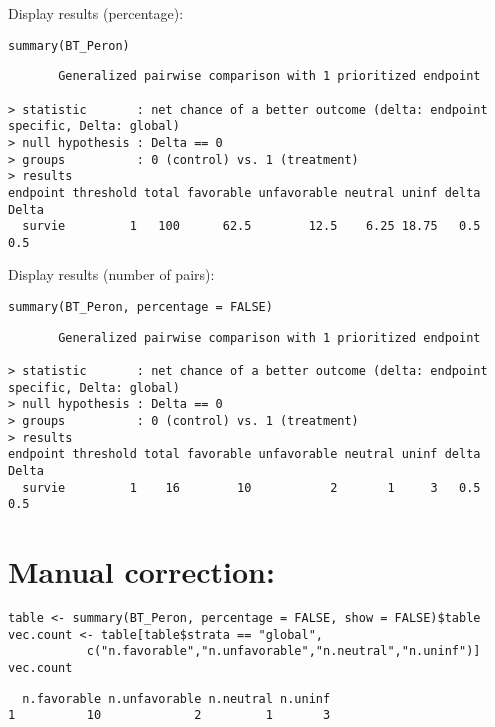 \documentclass{article}
\begin{document}
Display results (percentage):
\lstset{language=r,label= ,caption= ,captionpos=b,numbers=none}
\begin{lstlisting}
summary(BT_Peron)
\end{lstlisting}

\begin{verbatim}
       Generalized pairwise comparison with 1 prioritized endpoint

> statistic       : net chance of a better outcome (delta: endpoint specific, Delta: global) 
> null hypothesis : Delta == 0 
> groups          : 0 (control) vs. 1 (treatment) 
> results
endpoint threshold total favorable unfavorable neutral uninf delta Delta
  survie         1   100      62.5        12.5    6.25 18.75   0.5   0.5
\end{verbatim}

Display results (number of pairs):
\lstset{language=r,label= ,caption= ,captionpos=b,numbers=none}
\begin{lstlisting}
summary(BT_Peron, percentage = FALSE)
\end{lstlisting}

\begin{verbatim}
       Generalized pairwise comparison with 1 prioritized endpoint

> statistic       : net chance of a better outcome (delta: endpoint specific, Delta: global) 
> null hypothesis : Delta == 0 
> groups          : 0 (control) vs. 1 (treatment) 
> results
endpoint threshold total favorable unfavorable neutral uninf delta Delta
  survie         1    16        10           2       1     3   0.5   0.5
\end{verbatim}

\clearpage

\section{Manual correction:}
\label{sec:orgb574db8}
\lstset{language=r,label= ,caption= ,captionpos=b,numbers=none}
\begin{lstlisting}
table <- summary(BT_Peron, percentage = FALSE, show = FALSE)$table
vec.count <- table[table$strata == "global",
		   c("n.favorable","n.unfavorable","n.neutral","n.uninf")]
vec.count
\end{lstlisting}

\begin{verbatim}
  n.favorable n.unfavorable n.neutral n.uninf
1          10             2         1       3
\end{verbatim}
\end{document}
